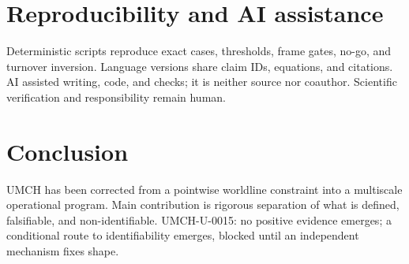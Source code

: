 \documentclass[11pt,a4paper]{article}
\begin{document}
\section{Reproducibility and AI assistance}\label{sec:u-reproducibility}
Deterministic scripts reproduce exact cases, thresholds, frame gates, no-go, and turnover inversion. Language versions share claim IDs, equations, and citations. AI assisted writing, code, and checks; it is neither source nor coauthor. Scientific verification and responsibility remain human.

\section{Conclusion}\label{sec:u-conclusion}
UMCH has been corrected from a pointwise worldline constraint into a multiscale operational program. Main contribution is rigorous separation of what is defined, falsifiable, and non-identifiable. UMCH-U-0015: no positive evidence emerges; a conditional route to identifiability emerges, blocked until an independent mechanism fixes shape.


\end{document}
